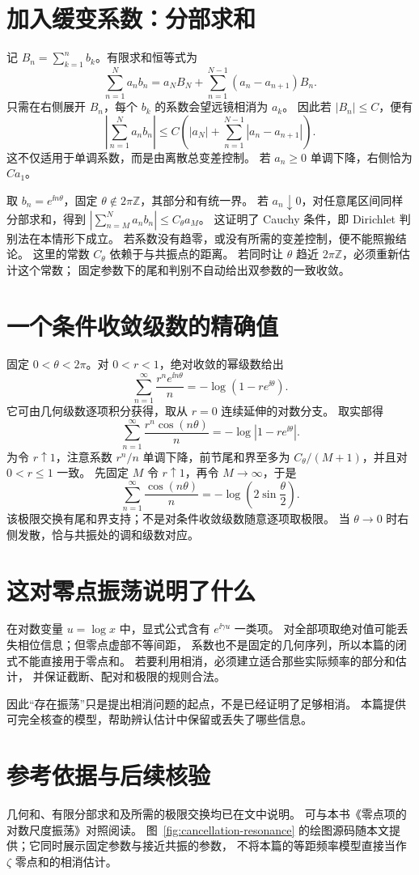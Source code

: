 \documentclass[UTF8,fontset=fandol,11pt]{ctexart}
\begin{document}
\section{加入缓变系数：分部求和}
记 $B_n=\sum_{k=1}^n b_k$。有限求和恒等式为
\[
 \sum_{n=1}^Na_nb_n=a_NB_N+
 \sum_{n=1}^{N-1}(a_n-a_{n+1})B_n.
\]
只需在右侧展开 $B_n$，每个 $b_k$ 的系数会望远镜相消为 $a_k$。
因此若 $|B_n|\le C$，便有
\[
 \left|\sum_{n=1}^Na_nb_n\right|
 \le C\left(|a_N|+\sum_{n=1}^{N-1}|a_n-a_{n+1}|\right).
\]
这不仅适用于单调系数，而是由离散总变差控制。
若 $a_n\ge0$ 单调下降，右侧恰为 $Ca_1$。

取 $b_n=e^{\ii n\theta}$，固定 $\theta\notin2\pi\mathbb Z$，其部分和有统一界。
若 $a_n\downarrow0$，对任意尾区间同样分部求和，得到
$\left|\sum_{n=M}^Na_nb_n\right|\le C_\theta a_M$。
这证明了 Cauchy 条件，即 Dirichlet 判别法在本情形下成立。
若系数没有趋零，或没有所需的变差控制，便不能照搬结论。
这里的常数 $C_\theta$ 依赖于与共振点的距离。
若同时让 $\theta$ 趋近 $2\pi\mathbb Z$，必须重新估计这个常数；
固定参数下的尾和判别不自动给出双参数的一致收敛。

\section{一个条件收敛级数的精确值}
固定 $0<\theta<2\pi$。对 $0<r<1$，绝对收敛的幂级数给出
\[
 \sum_{n=1}^\infty\frac{r^ne^{\ii n\theta}}n
 =-\log(1-re^{\ii\theta}).
\]
它可由几何级数逐项积分获得，取从 $r=0$ 连续延伸的对数分支。
取实部得
\[
 \sum_{n=1}^\infty\frac{r^n\cos(n\theta)}n
 =-\log|1-re^{\ii\theta}|.
\]
为令 $r\uparrow1$，注意系数 $r^n/n$ 单调下降，前节尾和界至多为
$C_\theta/(M+1)$，并且对 $0<r\le1$ 一致。
先固定 $M$ 令 $r\uparrow1$，再令 $M\to\infty$，于是
\[
 \sum_{n=1}^\infty\frac{\cos(n\theta)}n
 =-\log\left(2\sin\frac\theta2\right).
\]
该极限交换有尾和界支持；不是对条件收敛级数随意逐项取极限。
当 $\theta\to0$ 时右侧发散，恰与共振处的调和级数对应。

\section{这对零点振荡说明了什么}
在对数变量 $u=\log x$ 中，显式公式含有 $e^{\ii\gamma u}$ 一类项。
对全部项取绝对值可能丢失相位信息；但零点虚部不等间距，
系数也不是固定的几何序列，所以本篇的闭式不能直接用于零点和。
若要利用相消，必须建立适合那些实际频率的部分和估计，
并保证截断、配对和极限的规则合法。

因此“存在振荡”只是提出相消问题的起点，不是已经证明了足够相消。
本篇提供可完全核查的模型，帮助辨认估计中保留或丢失了哪些信息。

\section*{参考依据与后续核验}
几何和、有限分部求和及所需的极限交换均已在文中说明。
可与本书《零点项的对数尺度振荡》对照阅读。
图~\ref{fig:cancellation-resonance} 的绘图源码随本文提供；它同时展示固定参数与接近共振的参数，
不将本篇的等距频率模型直接当作 $\zeta$ 零点和的相消估计。
\end{document}
